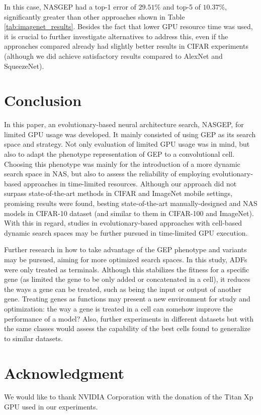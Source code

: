 \documentclass[conference]{IEEEtran}
\begin{document}
	In this case, NASGEP had a top-1 error of $29.51\%$ and top-5 of $10.37\%$, significantly greater than other approaches shown in Table \ref{tab:imagenet_results}. 
	Besides the fact that lower GPU resource time was used, it is crucial to further investigate alternatives to address this, even if the approaches compared already had slightly better results in CIFAR experiments (although we did achieve satisfactory results compared to AlexNet and SqueezeNet).
	
	\section{Conclusion}
	
	In this paper, an evolutionary-based neural architecture search, NASGEP, for limited GPU usage was developed.
	It mainly consisted of using GEP as its search space and strategy.
	Not only evaluation of limited GPU usage was in mind, but also to adapt the phenotype representation of GEP to a convolutional cell.
	Choosing this phenotype was mainly for the introduction of a more dynamic search space in NAS, but also to assess the reliability of employing evolutionary-based approaches in time-limited resources.
	Although our approach did not surpass state-of-the-art methods in CIFAR and ImageNet mobile settings, promising results were found, besting state-of-the-art manually-designed and NAS models in CIFAR-10 dataset (and similar to them in CIFAR-100 and ImageNet). 
	With this in regard, studies in evolutionary-based approaches with cell-based dynamic search spaces may be further pursued in time-limited GPU execution.
	
	Further research in how to take advantage of the GEP phenotype and variants may be pursued, aiming for more optimized search spaces.
	In this study, ADFs were only treated as terminals.
	Although this stabilizes the fitness for a specific gene (as limited the gene to be only added or concatenated in a cell), it reduces the ways a gene can be treated, such as being the input or output of another gene.
	Treating genes as functions may present a new environment for study and optimization: the way a gene is treated in a cell can somehow improve the performance of a model?
	Also, further experiments in different datasets but with the same classes would assess the capability of the best cells found to generalize to similar datasets.
	
	\section*{Acknowledgment}
	
	We would like to thank NVIDIA Corporation with the donation of the Titan Xp GPU used in our experiments.
	
	
	
	
\end{document}
